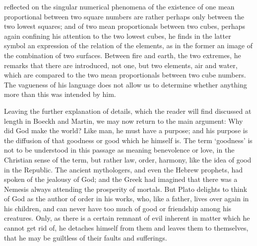 reflected on the singular numerical phenomena of the existence of one mean
proportional between two square numbers are rather perhaps only between
the two lowest squares; and of two mean proportionals between two cubes,
perhaps again confining his attention to the two lowest cubes, he finds in
the latter symbol an expression of the relation of the elements, as in the
former an image of the combination of two surfaces. Between fire and
earth, the two extremes, he remarks that there are introduced, not one,
but two elements, air and water, which are compared to the two mean
proportionals between two cube numbers. The vagueness of his language does
not allow us to determine whether anything more than this was intended by
him.

Leaving the further explanation of details, which the reader will find
discussed at length in Boeckh and Martin, we may now return to the main
argument: Why did God make the world? Like man, he must have a purpose;
and his purpose is the diffusion of that goodness or good which he himself
is. The term ‘goodness’ is not to be understood in this passage as meaning
benevolence or love, in the Christian sense of the term, but rather law,
order, harmony, like the idea of good in the Republic. The ancient
mythologers, and even the Hebrew prophets, had spoken of the jealousy of
God; and the Greek had imagined that there was a Nemesis always attending
the prosperity of mortals. But Plato delights to think of God as the
author of order in his works, who, like a father, lives over again in his
children, and can never have too much of good or friendship among his
creatures. Only, as there is a certain remnant of evil inherent in matter
which he cannot get rid of, he detaches himself from them and leaves them
to themselves, that he may be guiltless of their faults and sufferings.


